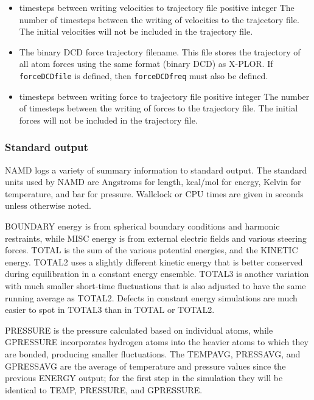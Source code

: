 \begin{itemize}
\item
{}
{timesteps between writing velocities to trajectory file}
{positive integer}
{
The number of timesteps between the writing of 
velocities to the trajectory file.  
The initial velocities will not be included in the trajectory file.
}

\item
{}
{
The binary DCD force trajectory filename.  
This file stores the trajectory of 
all atom forces using the same format (binary DCD) as X-PLOR.  
If {\tt forceDCDfile} is defined, then {\tt forceDCDfreq} must also 
be defined.  
}

\item
{}
{timesteps between writing force to trajectory file}
{positive integer}
{
The number of timesteps between the writing of 
forces to the trajectory file.  
The initial forces will not be included in the trajectory file.
}


\end{itemize}

\subsubsection{Standard output}

NAMD logs a variety of summary information to standard output.
The standard units used by NAMD are
Angstroms for length, kcal/mol for energy,
Kelvin for temperature, and bar for pressure.
Wallclock or CPU times are given in seconds unless otherwise noted.

BOUNDARY energy is from spherical boundary conditions and harmonic restraints,
while MISC energy is from external electric fields and various steering forces.
TOTAL is the sum of the various potential energies, and the KINETIC energy.
TOTAL2 uses a slightly different kinetic energy that is better conserved
during equilibration in a constant energy ensemble.
TOTAL3 is another variation with much smaller short-time fluctuations that
is also adjusted to have the same running average as TOTAL2.
Defects in constant energy simulations are much easier to spot in TOTAL3
than in TOTAL or TOTAL2.

PRESSURE is the pressure calculated based on individual atoms, while
GPRESSURE incorporates hydrogen atoms into the heavier atoms to which
they are bonded, producing smaller fluctuations.
The TEMPAVG, PRESSAVG, and GPRESSAVG are the average of temperature and
pressure values since the previous ENERGY output; for the first step
in the simulation they will be identical to TEMP, PRESSURE, and GPRESSURE.

